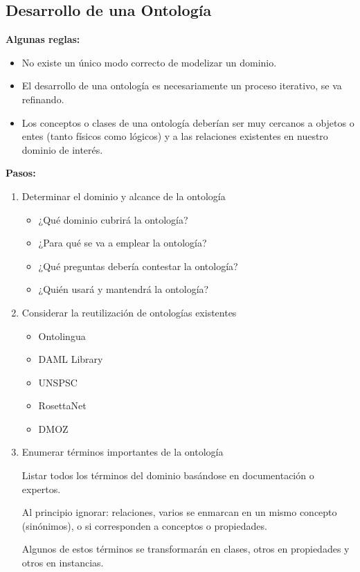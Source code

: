 \documentclass[12pt, twoside, openright]{report} %
\begin{document}
\subsection{Desarrollo de una Ontología}
\textbf{Algunas reglas:}
\begin{itemize}
	\item No existe un único modo correcto de modelizar un dominio.
	\item El desarrollo de una ontología es necesariamente un proceso iterativo, se va refinando.
	\item Los conceptos o clases de una ontología deberían ser muy cercanos a objetos o entes (tanto físicos como lógicos) y a las relaciones existentes en nuestro dominio de interés.
\end{itemize}

\textbf{Pasos:}
\begin{enumerate}
	\item Determinar el dominio y alcance de la ontología
	      \begin{itemize}
		      \item ¿Qué dominio cubrirá la ontología?
		      \item ¿Para qué se va a emplear la ontología?
		      \item ¿Qué preguntas debería contestar la ontología?
		      \item ¿Quién usará y mantendrá la ontología?
	      \end{itemize}
	\item Considerar la reutilización de ontologías existentes
	      \begin{itemize}
		      \item Ontolingua
		      \item DAML Library
		      \item UNSPSC
		      \item RosettaNet
		      \item DMOZ
	      \end{itemize}
	\item Enumerar términos importantes de la ontología
	      
	      Listar todos los términos del dominio basándose en documentación o expertos.
	      
	      Al principio ignorar: relaciones, varios se enmarcan en un mismo concepto (sinónimos), o si corresponden a conceptos o propiedades.
	      
	      Algunos de estos términos se transformarán en clases, otros en propiedades y otros en instancias.
	      

\end{enumerate}
\end{document}
